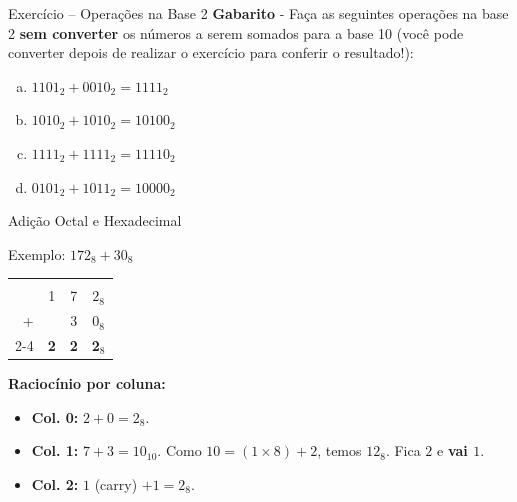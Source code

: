 \begin{frame}{Exercício -- Operações na Base 2}
    \textbf{Gabarito} -  Faça as seguintes operações na base 2 \textbf{sem converter} os números a serem somados para a base 10 (você pode converter depois de realizar o exercício para conferir o resultado!):




    \begin{enumerate}[a)]
        \item $1101_2 + 0010_2 = 1111_2$
        \item $1010_2 + 1010_2 = 10100_2$
        \item $1111_2 + 1111_2 = 11110_2$
        \item $0101_2 + 1011_2 = 10000_2$
    \end{enumerate}

\end{frame}
\begin{frame}{Adição Octal e Hexadecimal}


    \begin{exampleblock}{Exemplo: $172_8 + 30_8$}
        \centering
        \Large
        \begin{tabular}{r ccc}
            \color{blue}{\footnotesize (carry)} & \color{blue}{1} &            &                \\
                                                & 1               & 7          & $2_8$          \\
            +                                   &                 & 3          & $0_8$          \\ \cline{2-4}
                                                & \textbf{2}      & \textbf{2} & \textbf{2$_8$} \\
        \end{tabular}
    \end{exampleblock}

    \small
    \textbf{Raciocínio por coluna:}
    \begin{itemize}
        \item \textbf{Col. 0:} $2+0 = 2_8$.
        \item \textbf{Col. 1:} $7+3 = 10_{10}$. Como $10 = (1 \times 8) + 2$, temos \textbf{$12_8$}. Fica $2$ e \textbf{vai $1$}.
        \item \textbf{Col. 2:} $1$ (carry) $+ 1 = 2_8$.
    \end{itemize}
\end{frame}


